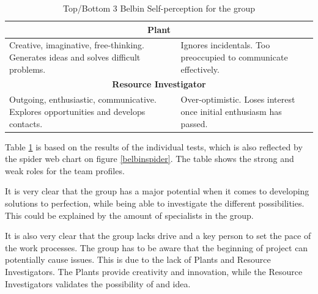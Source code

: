\begin{table}[ht]
\begin{tabular}{|p{}|p{}|}
\multicolumn{2}{|c|}{\textbf{Plant}}                                                                                                                                         \\ \hline
Creative, imaginative, free-thinking. Generates ideas and solves difficult problems.        & Ignores incidentals. Too preoccupied to communicate effectively.             \\ \hline
\multicolumn{2}{|c|}{\textbf{Resource Investigator}}                                                                                                                         \\ \hline
Outgoing, enthusiastic, communicative. Explores opportunities and develops contacts.        & Over-optimistic. Loses interest once initial enthusiasm has passed.          \\ \hline
\end{tabular}
\caption{Top/Bottom 3 Belbin Self-perception for the group}
\label{belbintable}
\end{table}

Table \ref{belbintable} is based on the results of the individual tests, which is also reflected by the spider web chart on figure \ref{belbinspider}. The table shows the strong and weak roles for the team profiles.

It is very clear that the group has a major potential when it comes to developing solutions to perfection, while being able to investigate the different possibilities. This could be explained by the amount of specialists in the group.

It is also very clear that the group lacks drive and a key person to set the pace of the work processes. The group has to be aware that the beginning of project  can potentially cause issues. This is due to the lack of Plants and Resource Investigators. The Plants provide creativity and innovation, while the Resource Investigators validates the possibility of and idea.
 


